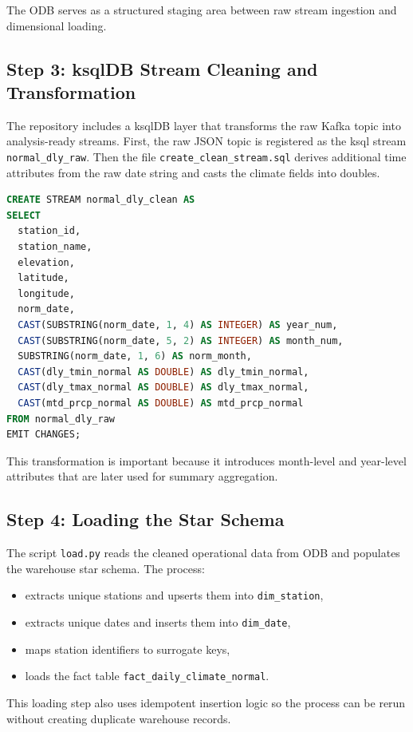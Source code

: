 \documentclass[11pt]{article}
\begin{document}
The ODB serves as a structured staging area between raw stream ingestion and dimensional loading.

\subsection{Step 3: ksqlDB Stream Cleaning and Transformation}
The repository includes a ksqlDB layer that transforms the raw Kafka topic into analysis-ready streams. First, the raw JSON topic is registered as the ksql stream \texttt{normal\_dly\_raw}. Then the file \texttt{create\_clean\_stream.sql} derives additional time attributes from the raw date string and casts the climate fields into doubles.

\begin{lstlisting}[language=SQL]
CREATE STREAM normal_dly_clean AS
SELECT
  station_id,
  station_name,
  elevation,
  latitude,
  longitude,
  norm_date,
  CAST(SUBSTRING(norm_date, 1, 4) AS INTEGER) AS year_num,
  CAST(SUBSTRING(norm_date, 5, 2) AS INTEGER) AS month_num,
  SUBSTRING(norm_date, 1, 6) AS norm_month,
  CAST(dly_tmin_normal AS DOUBLE) AS dly_tmin_normal,
  CAST(dly_tmax_normal AS DOUBLE) AS dly_tmax_normal,
  CAST(mtd_prcp_normal AS DOUBLE) AS mtd_prcp_normal
FROM normal_dly_raw
EMIT CHANGES;
\end{lstlisting}

This transformation is important because it introduces month-level and year-level attributes that are later used for summary aggregation.

\subsection{Step 4: Loading the Star Schema}
The script \texttt{load.py} reads the cleaned operational data from ODB and populates the warehouse star schema. The process:
\begin{itemize}
    \item extracts unique stations and upserts them into \texttt{dim\_station},
    \item extracts unique dates and inserts them into \texttt{dim\_date},
    \item maps station identifiers to surrogate keys,
    \item loads the fact table \texttt{fact\_daily\_climate\_normal}.
\end{itemize}

This loading step also uses idempotent insertion logic so the process can be rerun without creating duplicate warehouse records.
\end{document}
